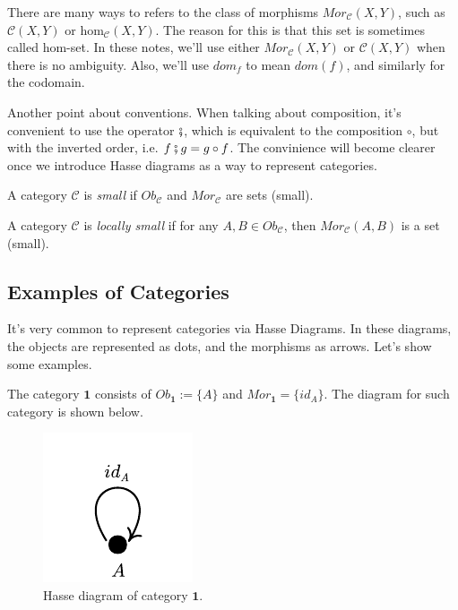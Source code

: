 There are many ways to refers to the class of morphisms $Mor_\mathcal C (X,Y)$, such as
$\mathcal C(X,Y)$ or $\text{hom}_\mathcal C (X,Y)$. The reason for this is that
this set is sometimes called hom-set. In these notes, we'll use either $Mor_\mathcal C (X,Y)$
or $\mathcal C (X,Y)$ when there is no ambiguity. Also, we'll use $dom_f$ to mean $dom(f)$,
and similarly for the codomain.

Another point about conventions. When talking about composition, it's convenient
to use the operator $\fatsemi$, which is equivalent to the composition $\circ$,
but with the inverted order, i.e. $f \fatsemi g = g \circ f$. The convinience
will become clearer once we introduce Hasse diagrams as a way to represent categories.

\begin{definition}
	A category $\mathcal C$ is \textit{small} if $Ob_\mathcal C$ and
	$Mor_\mathcal C$ are sets (small).
\end{definition}

\begin{definition}
	A category $\mathcal C$ is \textit{locally small} if
	for any $A, B \in Ob_\mathcal C$, then
	$Mor_\mathcal C(A,B)$ is a set (small).
\end{definition}

\subsection{Examples of Categories}

It's very common to represent categories via Hasse Diagrams. In these diagrams, the
objects are represented as dots, and the morphisms as arrows. Let's show some examples.

\begin{example}[Category $\bm 1$]
	The category $\bm 1$ consists of $Ob_{\bm 1} := \{A\}$ and $Mor_{\bm 1} = \{id_A\}$.
	The diagram for such category is shown below.
	\begin{figure}[H]
		\begin{center}
			\includegraphics{./notebooks/1Cat}
		\end{center}
		\caption{Hasse diagram of category $\bm 1$.}
		\label{fig:1Cat}
	\end{figure}
\end{example}

